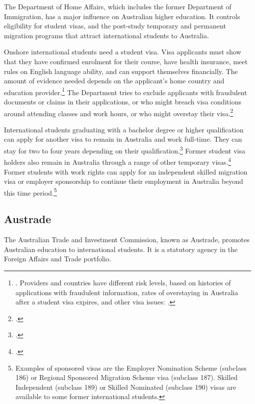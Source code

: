 \documentclass{grattan}
\begin{document}
The Department of Home Affairs, which includes the former Department of Immigration, has a major influence on Australian higher education. It controls eligibility for student visas, and the post-study temporary and permanent migration programs that attract international students to Australia.

Onshore international students need a student visa. Visa applicants must show that they have confirmed enrolment for their course, have health insurance, meet rules on English language ability, and can support themselves financially. The amount of evidence needed depends on the applicant's home country and education provider.\footnote{\textcite[][]{DepartmentofHomeAffairs2018studentvisasubcl}. Providers and countries have different risk levels, based on histories of applications with fraudulent information, rates of overstaying in Australia after a student visa expires, and other visa issues: \textcite[][]{DepartmentofHomeAffairs2018simplifiedstudent}.} The Department tries to exclude applicants with fraudulent documents or claims in their applications, or who might breach visa conditions around attending classes and work hours, or who might overstay their visa.\footcite[][]{DepartmentofHomeAffairs2018simplifiedstudent}

International students graduating with a bachelor degree or higher qualification can apply for another visa to remain in Australia and work full-time. They can stay for two to four years depending on their qualification.\footcite[][]{DepartmentofHomeAffairs2018temporarygraduate} Former student visa holders also remain in Australia through a range of other temporary visas.\footcite[][69]{DepartmentofHomeAffairs2018studentvisaandte} Former students with work rights can apply for an independent skilled migration visa or employer sponsorship to continue their employment in Australia beyond this time period.\footnote{Examples of sponsored visas are the Employer Nomination Scheme (subclass 186) or Regional Sponsored Migration Scheme visa (subclass 187). Skilled Independent (subclass 189) or Skilled Nominated (subclass 190) visas are available to some former international students.}

%
\subsection{Austrade}\label{subsec:austrade}

The Australian Trade and Investment Commission, known as Austrade, promotes Australian education to international students. It is a statutory agency in the Foreign Affairs and Trade portfolio.
\end{document}
